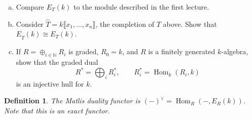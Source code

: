 \documentclass[11pt]{book}
\newtheorem{definition}[theorem]{Definition}
\numberwithin{equation}{section}
\numberwithin{theorem}{chapter}
\theoremstyle{definition}
\newtheorem*{basic properties}{Basic Properties}
\newtheorem*{Important Remark}{Important Remark}
\theoremstyle{remark}
\newcommand{\NN}{\mathbb{N}}
\newcommand{\Hom}{\operatorname{Hom}}
\begin{document}
\begin{enumerate}[1)]
\begin{enumerate}[a)]
		
		
		\item Compare $E_T(k)$ to the module described in the first lecture.
		
		
		
		\item Consider $\widehat{T} = k \llbracket x_1, \ldots, x_n \rrbracket$, the completion of $T$ above. Show that $E_{\widehat{T}}(k) \cong E_T(k)$.
		
		
		
		\item If $R = \oplus_{i\in \NN} R_i$ is graded, $R_0 = k$, and $R$ is a finitely generated $k$-algebra, show that the graded dual
		$$R^* = \bigoplus_i R_i^*, \qquad R_i^* = \Hom_k(R_i, k)$$
		is an injective hull for $k$.
	\end{enumerate}
\end{enumerate}


\begin{definition} The \emph{Matlis duality functor} is $(-)^{\vee} = \Hom_R(-,E_R(k))$. Note that this is an exact functor.
\end{definition}
\end{document}
